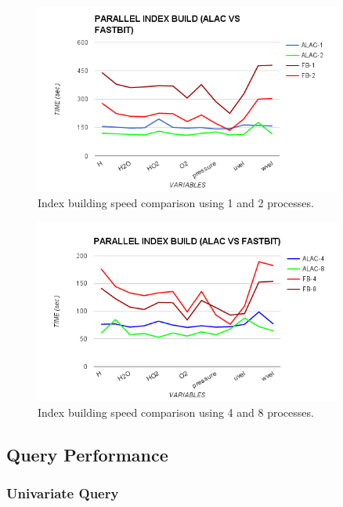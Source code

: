 \documentclass[11pt,a4paper]{article}
\begin{document}
\begin{figure}[ht]             
\begin{center}                 
    \includegraphics[width=0.90\textwidth]{figures/perf/alac-adios/parallel-idx-build-1}
\end{center}
\caption{Index building speed comparison using 1 and 2 processes.}
\label{fig:idx-build-1}  
\end{figure}


\begin{figure}[ht]             
\begin{center}                 
    \includegraphics[width=0.90\textwidth]{figures/perf/alac-adios/parallel-idx-build-2}
\end{center}
\caption{Index building speed comparison using 4 and 8 processes.}
\label{fig:idx-build-2}  
\end{figure}


\subsection{Query Performance}

\subsubsection{Univariate Query}
\end{document}
